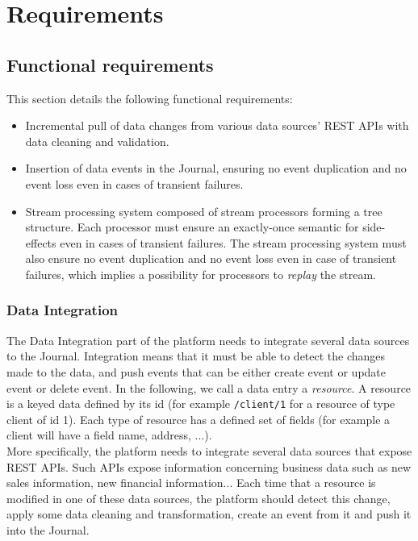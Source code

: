 \chapter{Requirements}

\section{Functional requirements}

This section details the following functional requirements:
\begin{itemize}
  \item Incremental pull of data changes from various data sources' REST APIs with data cleaning and validation.
  \item Insertion of data events in the Journal, ensuring no event duplication and no event loss even in cases of transient failures.
  \item Stream processing system composed of stream processors forming a tree structure. Each processor must ensure an exactly-once semantic for side-effects even in cases of transient failures. The stream processing system must also ensure no event duplication and no event loss even in case of transient failures, which implies a possibility for processors to \textit{replay} the stream.
\end{itemize}

\subsection{Data Integration}

The Data Integration part of the platform needs to integrate several data sources to the Journal. Integration means that it must be able 
to detect the changes made to the data, and push events that can be either create event or update event or delete event.
In the following, we call a data entry a \textit{resource}. A resource is a keyed data defined by its id (for example \verb|/client/1| for a
resource of type client of id 1). Each type of resource has a defined set of fields (for example a client
will have a field name, address, ...).
\\

More specifically, the platform needs to integrate several data sources that expose REST APIs. Such APIs expose information
concerning business data such as new sales information, new financial information...
Each time that a resource is modified in one of these data sources, the platform should detect this change, apply some data cleaning and transformation, create an 
event from it and push it into the Journal.


